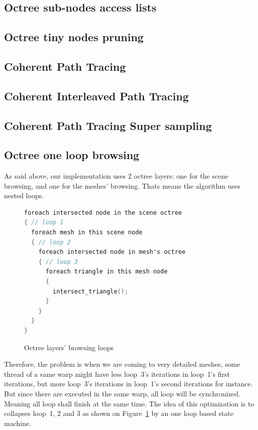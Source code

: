 \documentclass[10pt,twocolumn,a4paper]{article}
\begin{document}
\subsection{Octree sub-nodes access lists}
\subsection{Octree tiny nodes pruning}
\subsection{Coherent Path Tracing}
\subsection{Coherent Interleaved Path Tracing}
\subsection{Coherent Path Tracing Super sampling}
\subsection{Octree one loop browsing}
As said above, our implementation uses 2 octree layers: one for the scene browsing,
and one for the meshes' browsing. Thats means the algorithm uses nested loops.
\begin{figure}[H]
    \centering
\begin{lstlisting}[frame=single,language=C,breaklines=true,basicstyle=\tiny]
foreach intersected node in the scene octree
{ // loop 1
  foreach mesh in this scene node
  { // loop 2
    foreach intersected node in mesh's octree
    { // loop 3
      foreach triangle in this mesh node
      {
        intersect_triangle();
      }
    }
  }
}
\end{lstlisting}
    \caption{Octree layers' browsing loops}
    \label{code:octree_layers_loops}
\end{figure}

Therefore, the problem is when we are coming to very detailed meshes, some thread
of a same warp might have less loop~3's iterations in loop~1's first iterations,
but more loop~3's iterations in loop~1's second iterations for instance. But since
there are executed in the same warp, all loop will be synchronized. Meaning all
loop shall finish at the same time. The idea of this optimization
is to collapses loop~1, 2 and 3 as shown on Figure~\ref{code:octree_layers_loops}
by an one loop based state machine.
\end{document}
